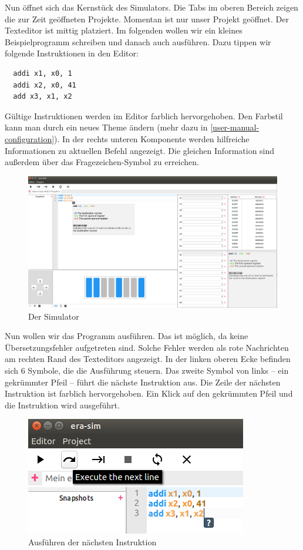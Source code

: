 Nun öffnet sich das Kernstück des Simulators. Die Tabs im oberen Bereich zeigen
die zur Zeit geöffneten Projekte. Momentan ist nur unser Projekt geöffnet. Der
Texteditor ist mittig platziert. Im folgenden wollen wir ein kleines Beispielprogramm schreiben und danach auch ausführen. Dazu tippen wir folgende Instruktionen in den Editor:
\begin{lstlisting}
  addi x1, x0, 1
  addi x2, x0, 41
  add x3, x1, x2
\end{lstlisting}
Gültige Instruktionen werden im Editor farblich hervorgehoben. Den Farbstil kann
man durch ein neues Theme ändern (mehr dazu in
\autoref{user-manual-configuration}). In der rechts unteren Komponente werden
hilfreiche Informationen zu aktuellen Befehl angezeigt. Die gleichen Information
sind außerdem über das Fragezeichen-Symbol zu erreichen.

\begin{figure}[H]
	\centering
	\includegraphics[scale=0.4]{Images/first-steps-2.png}
	\caption{Der Simulator}
\end{figure}

Nun wollen wir das Programm ausführen. Das
ist möglich, da keine Übersetzungsfehler aufgetreten sind. Solche Fehler werden
als rote Nachrichten am rechten Rand des Texteditors angezeigt. In der linken
oberen Ecke befinden sich 6 Symbole, die die Ausführung steuern. Das zweite
Symbol von links -- ein gekrümmter Pfeil -- führt die nächste Instruktion aus.
Die Zeile der nächsten Instruktion ist farblich hervorgehoben. Ein Klick auf den
gekrümmten Pfeil und die Instruktion wird ausgeführt.
\begin{figure}[H]
	\centering
	\includegraphics[scale=1.0]{Images/first-steps-3.png}
	\caption{Ausführen der nächsten Instruktion}
\end{figure}

